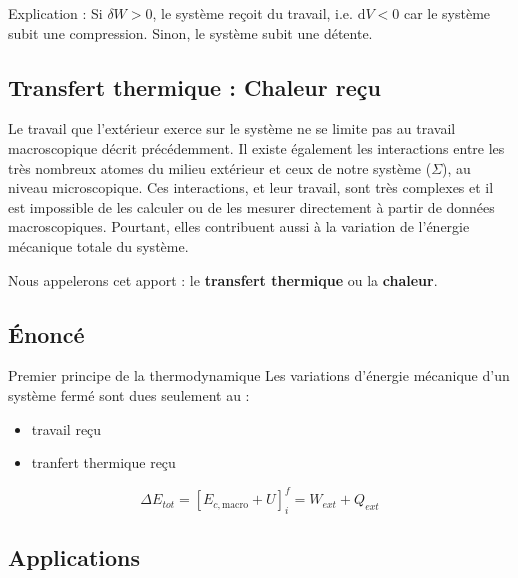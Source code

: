 Explication : Si $\delta W >0$, le système reçoit du travail, i.e. $\mathrm{d}V < 0$ car le système subit une compression. Sinon, le système subit une détente.

\subsection{Transfert thermique : Chaleur reçu} %
\label{sub:Transfert thermique : Chaleur reçu}

Le travail que l’extérieur exerce sur le système ne se limite pas au travail macroscopique décrit précédemment. Il existe également les interactions entre les très nombreux atomes du milieu extérieur et ceux de notre système ($\Sigma$), au niveau microscopique. Ces interactions, et leur travail, sont très complexes et il est impossible de les calculer ou de les mesurer directement à partir de données macroscopiques. Pourtant, elles contribuent aussi à la variation de l’énergie mécanique totale du système. 

Nous appelerons cet apport : le \textbf{transfert thermique} ou la \textbf{chaleur}.

\subsection{Énoncé} %
\label{sub:Énoncé}

\begin{Theorem}{Premier principe de la thermodynamique}{}
Les variations d'énergie mécanique d'un système fermé sont dues seulement au :
\begin{itemize}

    \item travail reçu 
    \item tranfert thermique reçu

\end{itemize}

\begin{equation}
  \Delta E _{tot} = [E _{c,\text{macro} } + U] _i ^{f} = W _{ext} + Q _{ext}
\end{equation}
\end{Theorem}

\subsection{Applications} %
\label{sub:Applications}

